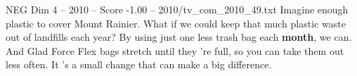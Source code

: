 \begin{textsample}{NEG Dim 4 – 2010 – Score -1.00 – 2010/tv\_com\_2010\_49.txt}  \label{ex:f4_neg_045}
Imagine enough plastic to cover Mount Rainier.
What if we could keep that much plastic waste out of landfills each year?
By using just one less trash bag each \textbf{month}, we can.
And Glad Force Flex bags stretch until they 're full, so you can take them out less often.
It 's a small change that can make a big difference.

\end{textsample}
